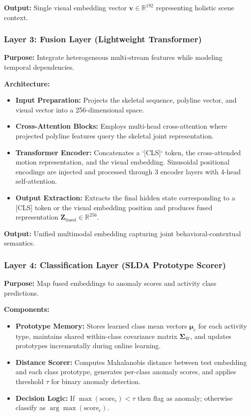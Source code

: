 \documentclass[12pt]{article}
\begin{document}
\textbf{Output:} Single visual embedding vector $\mathbf{v} \in \mathbb{R}^{192}$ representing holistic scene context.

\subsubsection{Layer 3: Fusion Layer (Lightweight Transformer)}

\textbf{Purpose:} Integrate heterogeneous multi-stream features while modeling temporal dependencies.

\textbf{Architecture:}
\begin{itemize}
    \item \textbf{Input Preparation:} Projects the skeletal sequence, polyline vector, and visual vector into a 256-dimensional space.
    
    \item \textbf{Cross-Attention Blocks:} Employs multi-head cross-attention where projected polyline features query the skeletal joint representation.
    
    \item \textbf{Transformer Encoder:} Concatenates a `[CLS]` token, the cross-attended motion representation, and the visual embedding. Sinusoidal positional encodings are injected and processed through 3 encoder layers with 4-head self-attention.
    
    \item \textbf{Output Extraction:} Extracts the final hidden state corresponding to a [CLS] token or the visual embedding position and produces fused representation $\mathbf{Z}_{\text{fused}} \in \mathbb{R}^{256}$.
\end{itemize}

\textbf{Output:} Unified multimodal embedding capturing joint behavioral-contextual semantics.

\subsubsection{Layer 4: Classification Layer (SLDA Prototype Scorer)}

\textbf{Purpose:} Map fused embeddings to anomaly scores and activity class predictions.

\textbf{Components:}
\begin{itemize}
    \item \textbf{Prototype Memory:} Stores learned class mean vectors $\boldsymbol{\mu}_c$ for each activity type, maintains shared within-class covariance matrix $\boldsymbol{\Sigma}_W$, and updates prototypes incrementally during online learning.
    
    \item \textbf{Distance Scorer:} Computes Mahalanobis distance between test embedding and each class prototype, generates per-class anomaly scores, and applies threshold $\tau$ for binary anomaly detection.
    
    \item \textbf{Decision Logic:} If $\max(\text{score}_c) < \tau$ then flag as anomaly; otherwise classify as $\arg\max(\text{score}_c)$.
\end{itemize}
\end{document}
